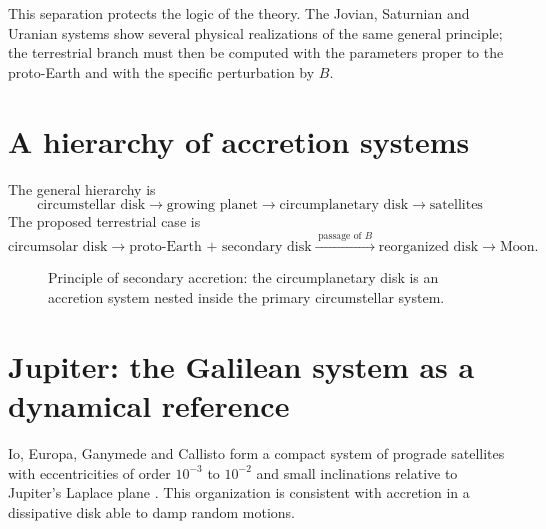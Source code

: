\documentclass[11pt,a4paper,openany]{report}
\begin{document}
This separation protects the logic of the theory. The Jovian, Saturnian and Uranian systems show
several physical realizations of the same general principle; the terrestrial branch must then be
computed with the parameters proper to the proto-Earth and with the specific perturbation by $B$.

\section{A hierarchy of accretion systems}

The general hierarchy is
\begin{equation}
\text{circumstellar disk}\to\text{growing planet}\to
\text{circumplanetary disk}\to\text{satellites}
\label{eq:hierarchie-gen}
\end{equation}
The proposed terrestrial case is
\begin{equation}
\text{circumsolar disk}\rightarrow\text{proto-Earth + secondary disk}
\xrightarrow{\;\text{passage of }B\;}\text{reorganized disk}\rightarrow\text{Moon}.
\label{eq:hierarchie-terre}
\end{equation}

\begin{figure}[htbp]
\centering
{}
\caption{Principle of secondary accretion: the circumplanetary disk is an accretion system nested
inside the primary circumstellar system.}
\label{fig:hierarchie}
\end{figure}

\section{Jupiter: the Galilean system as a dynamical reference}

Io, Europa, Ganymede and Callisto form a compact system of prograde satellites with eccentricities
of order $10^{-3}$ to $10^{-2}$ and small inclinations relative to Jupiter's Laplace plane
\cite{JPL}. This organization is consistent with accretion in a dissipative disk able to damp
random motions.
\end{document}
